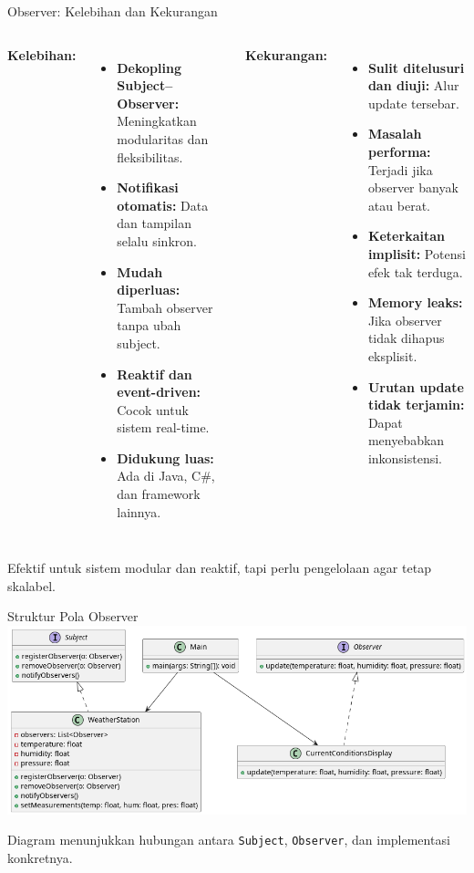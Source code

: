 \documentclass[aspectratio=169, table]{beamer}
\begin{document}
\begin{frame}{Observer: Kelebihan dan Kekurangan}
	\vspace{10pt}
	\begin{columns}[T]
		\textbf{Kelebihan:}
		\begin{itemize}
			\item \textbf{Dekopling Subject–Observer:} Meningkatkan modularitas dan fleksibilitas.
			\item \textbf{Notifikasi otomatis:} Data dan tampilan selalu sinkron.
			\item \textbf{Mudah diperluas:} Tambah observer tanpa ubah subject.
			\item \textbf{Reaktif dan event-driven:} Cocok untuk sistem real-time.
			\item \textbf{Didukung luas:} Ada di Java, C\#, dan framework lainnya.
		\end{itemize}
		
		\textbf{Kekurangan:}
		\begin{itemize}
			\item \textbf{Sulit ditelusuri dan diuji:} Alur update tersebar.
			\item \textbf{Masalah performa:} Terjadi jika observer banyak atau berat.
			\item \textbf{Keterkaitan implisit:} Potensi efek tak terduga.
			\item \textbf{Memory leaks:} Jika observer tidak dihapus eksplisit.
			\item \textbf{Urutan update tidak terjamin:} Dapat menyebabkan inkonsistensi.
		\end{itemize}
	\end{columns}
	
	\vspace{5pt}
	Efektif untuk sistem modular dan reaktif, tapi perlu pengelolaan agar tetap skalabel.
\end{frame}

\begin{frame}{Struktur Pola Observer}
	\vspace{10pt}
	\centering
	\includegraphics[width=\textwidth]{../../figures/out/observer.png}
	\vspace{8pt}
	
	\small Diagram menunjukkan hubungan antara \texttt{Subject}, \texttt{Observer}, dan implementasi konkretnya.
\end{frame}
\end{document}
